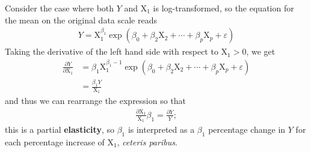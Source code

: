 \documentclass[
  11pt,
  letterpaper,
]{book}
\theoremstyle{definition}
\theoremstyle{definition}
\theoremstyle{definition}
\theoremstyle{definition}
\theoremstyle{remark}
\begin{document}
Consider the case where both \(Y\) and \(\mathrm{X}_1\) is log-transformed, so the equation for the mean on the original data scale reads
\begin{align*}
Y= \mathrm{X}_1^{\beta_1}\exp(\beta_0 + \beta_2\mathrm{X}_2 + \cdots + \beta_p\mathrm{X}_p + \varepsilon)
\end{align*}
Taking the derivative of the left hand side with respect to \(\mathrm{X}_1>0\), we get
\begin{align*}
\frac{\partial Y}{\partial \mathrm{X}_1}&= \beta_1 \mathrm{X}_1^{\beta_1-1}\exp(\beta_0 + \beta_2\mathrm{X}_2 + \cdots + \beta_p\mathrm{X}_p + \varepsilon)
\\&= \frac{\beta_1 Y}{\mathrm{X}_1}
\end{align*}
and thus we can rearrange the expression so that
\begin{align*}
\frac{\partial \mathrm{X}_1}{\mathrm{X}_1}\beta_1 = \frac{\partial Y}{Y};
\end{align*}
this is a partial \textbf{elasticity}, so \(\beta_1\) is interpreted as a \(\beta_1\) percentage change in \(Y\) for each percentage increase of \(\mathrm{X}_1\), \emph{ceteris paribus}.
\end{document}
